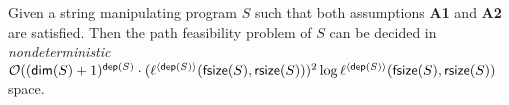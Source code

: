 \begin{theorem}\label{thm-generic-dec}
	Given a string manipulating program $S$ such that both assumptions \textbf{A1} and \textbf{A2} are satisfied. Then the path feasibility problem of $S$ can be decided in \emph{nondeterministic} 
	$\mathcal{O}((\mathsf{dim}(S)+1)^{\mathsf{dep}(S)} \cdot (\ell^{\langle \mathsf{dep}(S) \rangle}(\mathsf{fsize}(S), \mathsf{rsize}(S)))^2 \log \ell^{\langle \mathsf{dep}(S) \rangle}(\mathsf{fsize}(S), \mathsf{rsize}(S))$ space.
\end{theorem}


